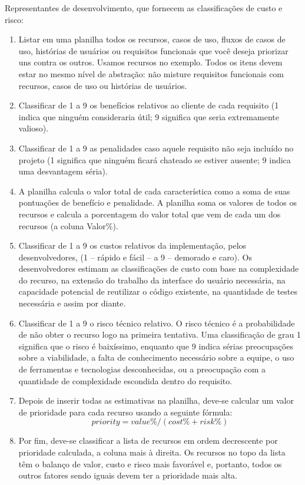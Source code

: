 \documentclass[runningheads]{llncs}
\begin{document}
Representantes de desenvolvimento, que fornecem as classificações de custo e risco:

\begin{enumerate}
    \item Listar em uma planilha todos os recursos, casos de uso, fluxos de casos de uso, histórias de usuários ou requisitos funcionais que você deseja priorizar uns contra os outros. Usamos recursos no exemplo. Todos os itens devem estar no mesmo nível de abstração: não misture requisitos funcionais com recursos, casos de uso ou histórias de usuários.
    \item Classificar de 1 a 9 os benefícios relativos ao cliente de cada requisito (1 indica que ninguém consideraria útil; 9 significa que seria extremamente valioso).
    \item Classificar de 1 a 9 as penalidades caso aquele requisito não seja incluído no projeto (1 significa que ninguém ficará chateado se estiver ausente; 9 indica uma desvantagem séria).
    \item A planilha calcula o valor total de cada característica como a soma de suas pontuações de benefício e penalidade. A planilha soma os valores de todos os recursos e calcula a porcentagem do valor total que vem de cada um dos recursos (a coluna Valor\%).
    \item Classificar de 1 a 9 os custos relativos da implementação, pelos desenvolvedores, (1 -- rápido e fácil -- a 9 -- demorado e caro). Os desenvolvedores estimam as classificações de custo com base na complexidade do recurso, na extensão do trabalho da interface do usuário necessária, na capacidade potencial de reutilizar o código existente, na quantidade de testes necessária e assim por diante.
    \item Classificar de 1 a 9 o risco técnico relativo. O risco técnico é a probabilidade de não obter o recurso logo na primeira tentativa. Uma classificação de grau 1 significa que o risco é baixíssimo, enquanto que 9 indica sérias preocupações sobre a viabilidade, a falta de conhecimento necessário sobre a equipe, o uso de ferramentas e tecnologias desconhecidas, ou a preocupação com a quantidade de complexidade escondida dentro do requisito.
    \item Depois de inserir todas as estimativas na planilha, deve-se calcular um valor de prioridade para cada recurso usando a seguinte fórmula: 
        \begin{equation}
            priority = value\% / (cost\% + risk\%)
        \end{equation}
    \item Por fim, deve-se classificar a lista de recursos em ordem decrescente por prioridade calculada, a coluna mais à direita. Os recursos no topo da lista têm o balanço de valor, custo e risco mais favorável e, portanto, todos os outros fatores sendo iguais devem ter a prioridade mais alta. 
\end{enumerate}
\end{document}
